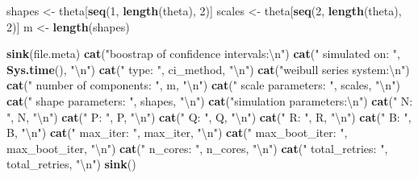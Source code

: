 \documentclass[
]{article}
\newenvironment{Shaded}{\begin{snugshade}}{\end{snugshade}}
\newcommand{\CharTok}[1]{\textcolor[rgb]{0.31,0.60,0.02}{#1}}
\newcommand{\DecValTok}[1]{\textcolor[rgb]{0.00,0.00,0.81}{#1}}
\newcommand{\KeywordTok}[1]{\textcolor[rgb]{0.13,0.29,0.53}{\textbf{#1}}}
\newcommand{\NormalTok}[1]{#1}
\newcommand{\StringTok}[1]{\textcolor[rgb]{0.31,0.60,0.02}{#1}}
\begin{document}
\begin{Shaded}
\begin{Highlighting}[]
\NormalTok{shapes \textless{}{-}}\StringTok{ }\NormalTok{theta[}\KeywordTok{seq}\NormalTok{(}\DecValTok{1}\NormalTok{, }\KeywordTok{length}\NormalTok{(theta), }\DecValTok{2}\NormalTok{)]}
\NormalTok{scales \textless{}{-}}\StringTok{ }\NormalTok{theta[}\KeywordTok{seq}\NormalTok{(}\DecValTok{2}\NormalTok{, }\KeywordTok{length}\NormalTok{(theta), }\DecValTok{2}\NormalTok{)]}
\NormalTok{m \textless{}{-}}\StringTok{ }\KeywordTok{length}\NormalTok{(shapes)}

\KeywordTok{sink}\NormalTok{(file.meta)}
\KeywordTok{cat}\NormalTok{(}\StringTok{"boostrap of confidence intervals:}\CharTok{\textbackslash{}n}\StringTok{"}\NormalTok{)}
\KeywordTok{cat}\NormalTok{(}\StringTok{"   simulated on: "}\NormalTok{, }\KeywordTok{Sys.time}\NormalTok{(), }\StringTok{"}\CharTok{\textbackslash{}n}\StringTok{"}\NormalTok{)}
\KeywordTok{cat}\NormalTok{(}\StringTok{"   type: "}\NormalTok{, ci\_method, }\StringTok{"}\CharTok{\textbackslash{}n}\StringTok{"}\NormalTok{)}
\KeywordTok{cat}\NormalTok{(}\StringTok{"weibull series system:}\CharTok{\textbackslash{}n}\StringTok{"}\NormalTok{)}
\KeywordTok{cat}\NormalTok{(}\StringTok{"   number of components: "}\NormalTok{, m, }\StringTok{"}\CharTok{\textbackslash{}n}\StringTok{"}\NormalTok{)}
\KeywordTok{cat}\NormalTok{(}\StringTok{"   scale parameters: "}\NormalTok{, scales, }\StringTok{"}\CharTok{\textbackslash{}n}\StringTok{"}\NormalTok{)}
\KeywordTok{cat}\NormalTok{(}\StringTok{"   shape parameters: "}\NormalTok{, shapes, }\StringTok{"}\CharTok{\textbackslash{}n}\StringTok{"}\NormalTok{)}
\KeywordTok{cat}\NormalTok{(}\StringTok{"simulation parameters:}\CharTok{\textbackslash{}n}\StringTok{"}\NormalTok{)}
\KeywordTok{cat}\NormalTok{(}\StringTok{"   N: "}\NormalTok{, N, }\StringTok{"}\CharTok{\textbackslash{}n}\StringTok{"}\NormalTok{)}
\KeywordTok{cat}\NormalTok{(}\StringTok{"   P: "}\NormalTok{, P, }\StringTok{"}\CharTok{\textbackslash{}n}\StringTok{"}\NormalTok{)}
\KeywordTok{cat}\NormalTok{(}\StringTok{"   Q: "}\NormalTok{, Q, }\StringTok{"}\CharTok{\textbackslash{}n}\StringTok{"}\NormalTok{)}
\KeywordTok{cat}\NormalTok{(}\StringTok{"   R: "}\NormalTok{, R, }\StringTok{"}\CharTok{\textbackslash{}n}\StringTok{"}\NormalTok{)}
\KeywordTok{cat}\NormalTok{(}\StringTok{"   B: "}\NormalTok{, B, }\StringTok{"}\CharTok{\textbackslash{}n}\StringTok{"}\NormalTok{)}
\KeywordTok{cat}\NormalTok{(}\StringTok{"   max\_iter: "}\NormalTok{, max\_iter, }\StringTok{"}\CharTok{\textbackslash{}n}\StringTok{"}\NormalTok{)}
\KeywordTok{cat}\NormalTok{(}\StringTok{"   max\_boot\_iter: "}\NormalTok{, max\_boot\_iter, }\StringTok{"}\CharTok{\textbackslash{}n}\StringTok{"}\NormalTok{)}
\KeywordTok{cat}\NormalTok{(}\StringTok{"   n\_cores: "}\NormalTok{, n\_cores, }\StringTok{"}\CharTok{\textbackslash{}n}\StringTok{"}\NormalTok{)}
\KeywordTok{cat}\NormalTok{(}\StringTok{"   total\_retries: "}\NormalTok{, total\_retries, }\StringTok{"}\CharTok{\textbackslash{}n}\StringTok{"}\NormalTok{)}
\KeywordTok{sink}\NormalTok{()}


\end{Highlighting}
\end{Shaded}
\end{document}
